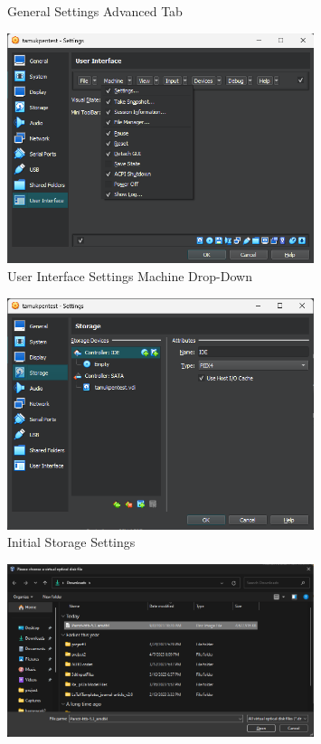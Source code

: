 \documentclass[12pt]{article}
\newenvironment{problem}[2][Problem]{\begin{trivlist}
\item[\hskip \labelsep {\bfseries #1}\hskip \labelsep {\bfseries #2.}]}{\end{trivlist}}
\begin{document}
\begin{problem}{1}
\begin{figure}[H]
        \caption{General Settings Advanced Tab}
    \end{figure}
    \begin{figure}[H]
        \centering
        \includegraphics[width=0.8\textwidth]{ui_machine}
        \caption{User Interface Settings Machine Drop-Down}
    \end{figure}
    \begin{figure}[H]
        \centering
        \includegraphics[width=0.8\textwidth]{storage1}
        \caption{Initial Storage Settings}
    \end{figure}
    \begin{figure}[H]
        \centering
        \includegraphics[width=0.8\textwidth]{iso}

\end{figure}
\end{problem}
\end{document}
